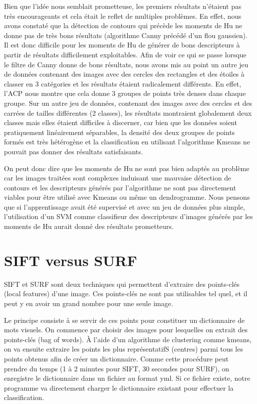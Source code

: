 \documentclass[12pt,a4paper,utf8x]{report}
\begin{document}
        Bien que l'idée nous semblait prometteuse, les premiers résultats n'étaient pas très encourageants et cela était le reflet de multiples problèmes. En effet, nous avons constaté que la détection de contours qui précède les moments de Hu ne donne pas de très bons résultats (algorithme Canny précédé d'un flou gaussien). Il est donc difficile pour les moments de Hu de générer de bons descripteurs à partir de résultats difficilement exploitables. Afin de voir ce qui se passe lorsque le filtre de Canny donne de bons résultats, nous avons mis au point un autre jeu de données contenant des images avec des cercles des rectangles et des étoiles à classer en 3 catégories et les résultats étaient radicalement différents. En effet, l'ACP nous montre que cela donne 3 groupes de points très denses dans chaque groupe. Sur un autre jeu de données, contenant des images avec des cercles et des carrées de tailles différentes (2 classes), les résultats montraient globalement deux classes mais elles étaient difficiles à discerner, car bien que les données soient pratiquement linéairement séparables, la densité des deux groupes de points formés est très hétérogène et la classification en utilisant l'algorithme Kmeans ne pouvait pas donner des résultats satisfaisants.

        On peut donc dire que les moments de Hu ne sont pas bien adaptés au problème car les images traitées sont complexes induisant une mauvaise détection de contours et les descripteurs générés par l'algorithme ne sont pas directement viables pour être utilisé avec Kmeans ou même un dendrogramme. Nous pensons que si l'apprentissage avait été supervisé et avec un jeu de données plus simple, l'utilisation d'un SVM comme classifieur des descripteurs d'images générés par les moments de Hu aurait donné des résultats prometteurs.

    \section{SIFT versus SURF}
        SIFT et SURF sont deux techniques qui permettent d'extraire des points-clés (local features) d'une image. Ces points-clés ne sont pas utilisables tel quel, et il peut y en avoir un grand nombre pour une seule image. 

        Le principe consiste à se servir de ces points pour constituer un dictionnaire de mots visuels. On commence par choisir des images pour lesquelles on extrait des points-clés (bag of words). À l'aide d'un algorithme de clustering comme kmeans, on va ensuite extraire les points les plus représentatifS (centres) parmi tous les points obtenus afin de créer un dictionnaire. Comme cette procédure peut prendre du temps (1 à 2 minutes pour SIFT, 30 secondes pour SURF), on enregistre le dictionnaire dans un fichier au format yml. Si ce fichier existe, notre programme va directement charger le dictionnaire existant pour effectuer la classification.
\end{document}
